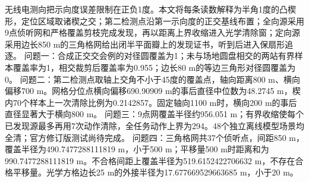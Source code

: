 无线电测向把示向度误差限制在正负1度。本文将每条读数解释为半角1度的凸楔形，定位区域取诸楔之交；第二检测点沿第一示向度的正交基线布置；全向源采用9点侦听网和严格覆盖剪枝完成发现，再以距离上界收缩进入光学清除窗；定向源采用边长850 m的三角格网给出闭半平面瓣上的发现证书，听到后进入保扇形追逐。
问题一：合成正交交会例的对径圆覆盖为1；未与场地圆盘相交的两站有界样本覆盖率为1，相交裁剪后覆盖率为0.955；边长80 m的等边三角形对径圆覆盖为0。
问题二：第二检测点取轴上交角不小于45度的覆盖点，轴向距离800 m、横向偏移700 m。网格分位点横向偏移690.90909 m的事后直径中位数为48.2745 m，楔内70个样本上一次清除比例为0.2142857。固定轴向1100 m时，横向200 m的事后直径显著大于横向800 m。
问题三：9点网覆盖半径约956.051 m；有界收缩使每个已发现源最多再用7次动作清除，全任务动作上界为294。48个独立离线模型场景均全清；官方修订版测试尚待完成。
问题四：三角格网共37个侦听点，间距850 m，覆盖半径为490.7477288111819 m，小于500 m；平移量500 m时距离和为990.7477288111819 m。不合格间距上覆盖半径为519.6152422706632 m，不存在合格平移量。光学方格边长25 m的外接半径为17.677669529663685 m，小于20 m。
